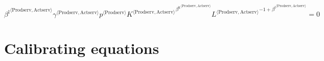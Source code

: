 \begin{equation}
{{\beta^{\mathrm{l}}}^{\langle \mathrm{\mathrm{Prodserv}},\mathrm{\mathrm{Actserv}}\rangle}} {{\gamma}^{\langle \mathrm{\mathrm{Prodserv}},\mathrm{\mathrm{Actserv}}\rangle}} {{p}^{\langle \mathrm{Prodserv}\rangle}} {{{K}^{\langle \mathrm{Prodserv},\mathrm{Actserv}\rangle}}^{{\beta^{\mathrm{k}}}^{\langle \mathrm{\mathrm{Prodserv}},\mathrm{\mathrm{Actserv}}\rangle}}} {{{L}^{\langle \mathrm{Prodserv},\mathrm{Actserv}\rangle}}^{-1 + {\beta^{\mathrm{l}}}^{\langle \mathrm{\mathrm{Prodserv}},\mathrm{\mathrm{Actserv}}\rangle}}} = 0
\end{equation}



\section{Calibrating equations}

